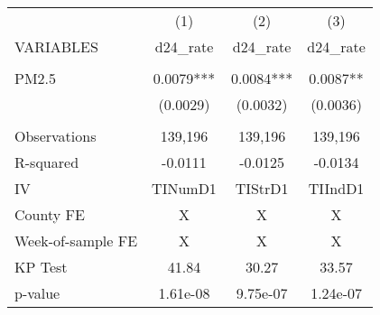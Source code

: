 \begin{tabular}{lccc} \hline
 & (1) & (2) & (3) \\
VARIABLES & d24\_rate & d24\_rate & d24\_rate \\ \hline
 &  &  &  \\
PM2.5 & 0.0079*** & 0.0084*** & 0.0087** \\
 & (0.0029) & (0.0032) & (0.0036) \\
 &  &  &  \\
Observations & 139,196 & 139,196 & 139,196 \\
R-squared & -0.0111 & -0.0125 & -0.0134 \\
IV & TINumD1 & TIStrD1 & TIIndD1 \\
County FE & X & X & X \\
Week-of-sample FE & X & X & X \\
KP Test & 41.84 & 30.27 & 33.57 \\
 p-value & 1.61e-08 & 9.75e-07 & 1.24e-07 \\ \hline
\end{tabular}

